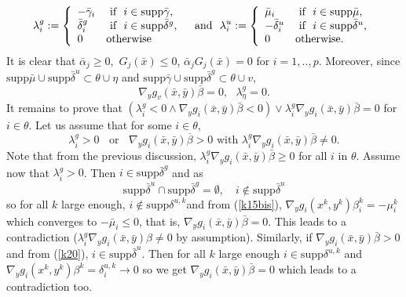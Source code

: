       	\[
       	\lambda_{i}^{g}:=\left\{
       	\begin{array}
       	[c]{ll}%
       	-\bar{\gamma}_{i} & \mbox{ if }\text{ }i\in\mathrm{supp}\bar{\gamma
       	},\text{\medskip}\\
       	\bar{\delta}_{i}^{g} & \mbox{ if }\text{ }i\in\mathrm{supp}\bar{\delta}%
       	^{g},\text{\medskip}\\
       	0 & \mbox{otherwise}
       	\end{array}
       	\right.  \text{ \ and \ }\lambda_{i}^{u}:=\left\{
       	\begin{array}
       	[c]{ll}%
       	\bar{\mu}_{i} & \mbox{ if }\text{ }i\in\mathrm{supp}\bar{\mu},\text{\medskip}\\
       	-\bar{\delta}_{i}^{u} & \mbox{ if }\text{ }i\in\mathrm{supp}\bar{\delta}
       	^{u},\text{\medskip}\\
       	0 & \mbox{otherwise}.
       	\end{array}
       	\right.
       	\]
       	It is clear that $\bar{\alpha}_{j}\geq0,$ $G_{j}(\bar{x})\leq0$, 
       	$\bar{\alpha}_{j}G_{j}(\bar{x})=0$ for $i=1,..,p$. Moreover,  since
       	$\mathrm{supp}\bar{\mu}\cup\mathrm{supp}\bar{\delta}^{u}\subset\theta\cup\eta$
       	and $\mathrm{supp}\bar{\gamma}\cup\mathrm{supp}\bar{\delta}^{g}\subset
       	\theta\cup v$, 
       	\[
       	\nabla_{y}g_{v}(\bar{x},\bar{y})\overline{\beta}=0,\text{ \ }\lambda_{\eta
       	}^{g}=0.
       	\]
       	It remains to prove that $(\lambda_{i}^{g}<0\wedge\nabla_{y}g_{i}(\bar{x}
       	,\bar{y})\bar{\beta}<0)\vee\lambda_{i}^{g}\nabla_{y}g_{i}(\bar{x},\bar{y}
       	)\bar{\beta}=0$ for $i\in\theta.$ Let us assume that for some $i\in\theta$,
       	\[
       	\lambda_{i}^{g}>0\;\;\mbox{ or }\;\;\nabla_{y}g_{i}(\bar{x},\bar{y}
       	)\overline{\beta}>0\text{ with }\lambda_{i}^{g}\nabla_{y}g_{i}(\bar{x},\bar
       	{y})\bar{\beta}\neq0.
       	\]
       	Note that from the previous discussion, $\lambda_{i}^{g}\nabla_{y}g_{i}
       	(\bar{x},\bar{y})\bar{\beta}\geq0$ for all $i$ in $\theta.$ Assume now that
       	$\lambda_{i}^{g}>0$. Then $i\in\mathrm{supp}\bar{\delta}^{g}$ and as
        \[
        \mathrm{supp}\bar{\delta}^{u}\cap \textrm{supp} \bar{\delta}^{g}
       	=\emptyset, \quad i\notin\mathrm{supp}\bar{\delta}^{u}
        \]
        so for all $k$ large
       	enough, $i\notin\mathrm{supp}\delta^{u,k}$and from (\ref{k15bis}), $\nabla
       	_{y}g_{i}(x^{k},y^{k})\beta_{i}^{k}=-\mu_{i}^{k}$ which converges to
       	$-\bar{\mu}_{i}\leq0$, that is, $\nabla_{y}g_{i}(\bar{x},\bar{y})\bar{\beta
       	}=0.$ This leads to a contradiction ($\lambda_{i}^{g}\nabla_{y}g_{i}(\bar
       	{x},\bar{y})\beta\neq0$ by assumption). Similarly, if $\nabla_{y}g_{i}(\bar
       	{x},\bar{y})\bar{\beta}>0$ and from (\ref{k20}), $i\in\mathrm{supp}\bar
       	{\delta}^{u}.$ Then for all $k$ large enough $i\in\mathrm{supp}\delta^{u,k}$
       	and $\nabla_{y}g_{i}(x^{k},y^{k})\beta^{k}=\delta_{i}^{u,k}\rightarrow0$ so we
       	get $\nabla_{y}g_{i}(\bar{x},\bar{y})\bar{\beta}=0$ which leads to a
       	contradiction too. 



